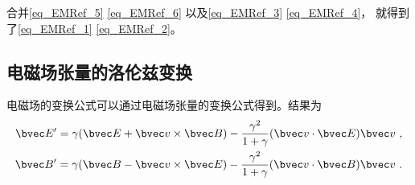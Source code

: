 合并\autoref{eq_EMRef_5} \autoref{eq_EMRef_6} 以及\autoref{eq_EMRef_3} \autoref{eq_EMRef_4}， 就得到了\autoref{eq_EMRef_1} \autoref{eq_EMRef_2}。


\subsection{电磁场张量的洛伦兹变换}

电磁场的变换公式可以通过电磁场张量的变换公式得到。结果为
\begin{equation}
\begin{aligned}
\bvec E'=\gamma(\bvec E+\bvec v\times \bvec B)-\frac{\gamma^2}{1+\gamma}(\bvec v \cdot \bvec E)\bvec v~,\\
\bvec B'=\gamma(\bvec B-\bvec v\times \bvec E)-\frac{\gamma^2}{1+\gamma}(\bvec v \cdot \bvec B)\bvec v~.
\end{aligned}
\end{equation}
